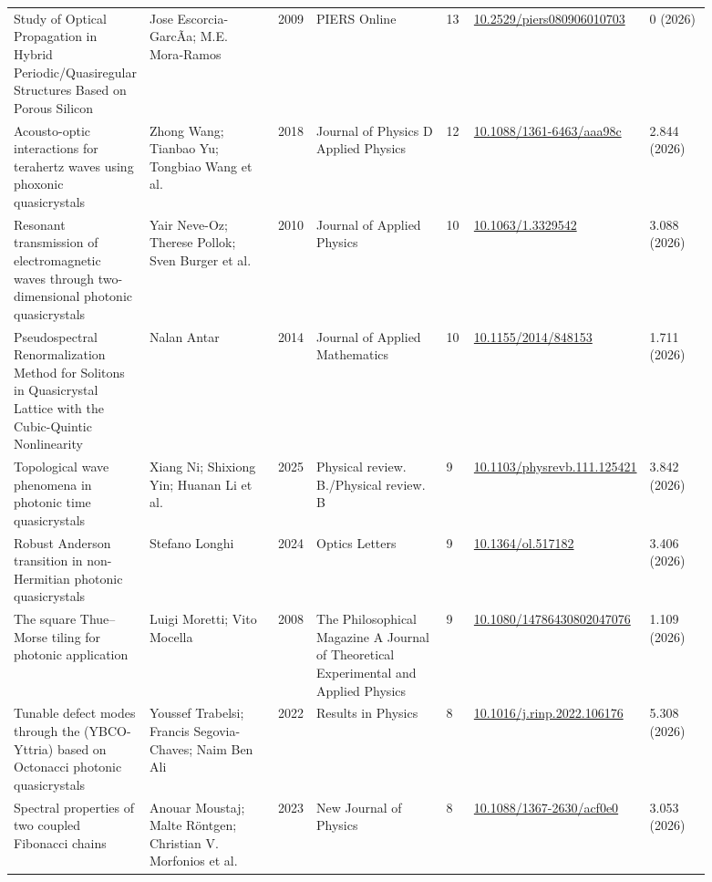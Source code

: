 \documentclass[10pt,a4paper]{article}
\begin{document}
{\begin{longtable}{p{0.192\linewidth}p{0.192\linewidth}p{0.043\linewidth}p{0.192\linewidth}p{0.043\linewidth}p{0.132\linewidth}p{0.096\linewidth}}
Study of Optical Propagation in Hybrid Periodic/Quasiregular Structures Based on Porous Silicon & Jose Escorcia-GarcÃ­a; M.E. Mora‐Ramos & 2009 & PIERS Online & 13 & \href{https://doi.org/10.2529/piers080906010703}{10.2529/piers080906010703} & 0 (2026) \\
Acousto-optic interactions for terahertz waves using phoxonic quasicrystals & Zhong Wang; Tianbao Yu; Tongbiao Wang et al. & 2018 & Journal of Physics D Applied Physics & 12 & \href{https://doi.org/10.1088/1361-6463/aaa98c}{10.1088/1361-6463/aaa98c} & 2.844 (2026) \\
Resonant transmission of electromagnetic waves through two-dimensional photonic quasicrystals & Yair Neve-Oz; Therese Pollok; Sven Burger et al. & 2010 & Journal of Applied Physics & 10 & \href{https://doi.org/10.1063/1.3329542}{10.1063/1.3329542} & 3.088 (2026) \\
Pseudospectral Renormalization Method for Solitons in Quasicrystal Lattice with the Cubic-Quintic Nonlinearity & Nalan Antar & 2014 & Journal of Applied Mathematics & 10 & \href{https://doi.org/10.1155/2014/848153}{10.1155/2014/848153} & 1.711 (2026) \\
Topological wave phenomena in photonic time quasicrystals & Xiang Ni; Shixiong Yin; Huanan Li et al. & 2025 & Physical review. B./Physical review. B & 9 & \href{https://doi.org/10.1103/physrevb.111.125421}{10.1103/physrevb.111.125421} & 3.842 (2026) \\
Robust Anderson transition in non-Hermitian photonic quasicrystals & Stefano Longhi & 2024 & Optics Letters & 9 & \href{https://doi.org/10.1364/ol.517182}{10.1364/ol.517182} & 3.406 (2026) \\
The square Thue–Morse tiling for photonic application & Luigi Moretti; Vito Mocella & 2008 & The Philosophical Magazine A Journal of Theoretical Experimental and Applied Physics & 9 & \href{https://doi.org/10.1080/14786430802047076}{10.1080/14786430802047076} & 1.109 (2026) \\
Tunable defect modes through the (YBCO-Yttria) based on Octonacci photonic quasicrystals & Youssef Trabelsi; Francis Segovia-Chaves; Naim Ben Ali & 2022 & Results in Physics & 8 & \href{https://doi.org/10.1016/j.rinp.2022.106176}{10.1016/j.rinp.2022.106176} & 5.308 (2026) \\
Spectral properties of two coupled Fibonacci chains & Anouar Moustaj; Malte Röntgen; Christian V. Morfonios et al. & 2023 & New Journal of Physics & 8 & \href{https://doi.org/10.1088/1367-2630/acf0e0}{10.1088/1367-2630/acf0e0} & 3.053 (2026) \\

\end{longtable}}
\end{document}
